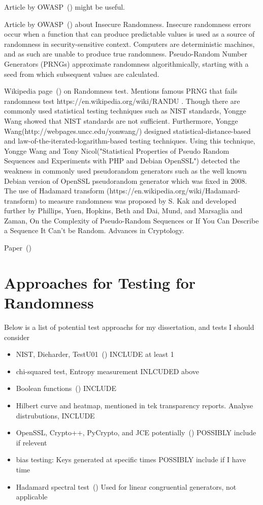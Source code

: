 Article by OWASP~(\cite{OWASP}) might be useful.

Article by OWASP~(\cite{OWASP2}) about Insecure Randomness. Insecure randomness errors occur when a function that can produce predictable values is used as a source of randomness in security-sensitive context. Computers are deterministic machines, and as such are unable to produce true randomness. Pseudo-Random Number Generators (PRNGs) approximate randomness algorithmically, starting with a seed from which subsequent values are calculated.\par

Wikipedia page~(\cite{WIKI}) on Randomness test. Mentions famous PRNG that fails randomness test https://en.wikipedia.org/wiki/RANDU . Though there are commonly used statistical testing techniques such as NIST standards, Yongge Wang showed that NIST standards are not sufficient. Furthermore, Yongge Wang(http://webpages.uncc.edu/yonwang/) designed statistical-distance-based and law-of-the-iterated-logarithm-based testing techniques. Using this technique, Yongge Wang and Tony Nicol("Statistical Properties of Pseudo Random Sequences and Experiments with PHP and Debian OpenSSL") detected the weakness in commonly used pseudorandom generators such as the well known Debian version of OpenSSL pseudorandom generator which was fixed in 2008.  The use of Hadamard transform (https://en.wikipedia.org/wiki/Hadamard-transform) to measure randomness was proposed by S. Kak and developed further by Phillips, Yuen, Hopkins, Beth and Dai, Mund, and Marsaglia and Zaman, On the Complexity of Pseudo-Random Sequences or If You Can Describe a Sequence It Can't be Random. Advances in Cryptology. 

Paper~(\cite{inproceedings})
\section{Approaches for Testing for Randomness}
\label{sec:TestApproachs}

Below is a list of potential test approachs for my dissertation, and tests I should consider
\begin{itemize}
    \item NIST, Dieharder, TestU01~(\cite{10.1145/3447773}) INCLUDE at least 1
    \item chi-squared test, Entropy measurement INLCUDED above
    \item Boolean functions~(\cite{10.1145/3205455.3205518}) INCLUDE
    \item Hilbert curve and heatmap, mentioned in tek transparency reports. Analyse distrubutions, INCLUDE
    \item OpenSSL, Crypto++, PyCrypto, and JCE potentially~(\cite{linkedInArticle}) POSSIBLY include if relevent
    \item bias testing: Keys generated at specific times POSSIBLY include if I have time
    \item Hadamard spectral test~(\cite{WIKI}) Used for linear congruential generators, not applicable
\end{itemize}


